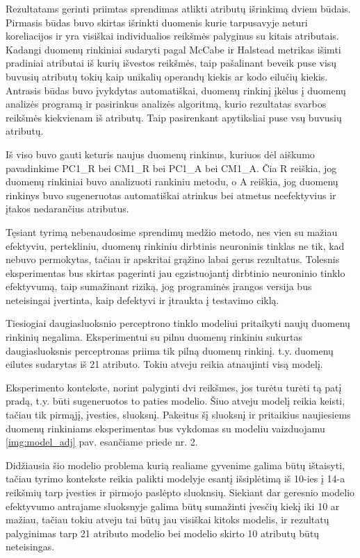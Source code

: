 \documentclass{VUMIFPSbakalaurinis}
\begin{document}
Rezultatams gerinti priimtas sprendimas atlikti atributų išrinkimą dviem būdais. Pirmasis būdas buvo skirtas išrinkti duomenis kurie tarpusavyje neturi koreliacijos ir yra visiškai individualios reikšmės palyginus su kitais atributais. Kadangi duomenų rinkiniai sudaryti pagal McCabe ir Halstead metrikas išimti pradiniai atributai iš kurių išvestos reikšmės, taip pašalinant beveik puse visų buvusių atributų tokių kaip unikalių operandų kiekis ar kodo eilučių kiekis. Antrasis būdas buvo įvykdytas automatiškai, duomenų rinkinį įkėlus į duomenų analizės programą ir pasirinkus analizės algoritmą, kurio rezultatas svarbos reikšmės kiekvienam iš atributų. Taip pasirenkant apytiksliai puse vsų buvusių atributų.

Iš viso buvo gauti keturis naujus duomenų rinkinus, kuriuos dėl aiškumo pavadinkime PC1\_R bei CM1\_R bei PC1\_A bei CM1\_A. Čia R reiškia, jog duomenų rinkiniai buvo analizuoti rankiniu metodu, o A reiškia, jog duomenų rinkinys buvo sugeneruotas automatiškai atrinkus bei atmetus neefektyvius ir įtakos nedarančius atributus.

Tęsiant tyrimą nebenaudosime sprendimų medžio metodo, nes vien su mažiau efektyviu, pertekliniu, duomenų rinkiniu dirbtinis neuroninis tinklas ne tik, kad nebuvo permokytas, tačiau ir apskritai grąžino labai gerus rezultatus. Tolesnis eksperimentas bus skirtas pagerinti jau egzistuojantį dirbtinio neuroninio tinklo efektyvumą, taip sumažinant riziką, jog programinės įrangos versija bus neteisingai įvertinta, kaip defektyvi ir įtraukta į testavimo ciklą.

Tiesiogiai daugiasluoksnio perceptrono tinklo modeliui pritaikyti naujų duomenų rinkinių negalima. Eksperimentui su pilnu duomenų rinkiniu sukurtas daugiasluoksnis perceptronas priima tik pilną duomenų rinkinį. t.y. duomenų eilutes sudarytas iš 21 atributo. Tokiu atveju reikia atnaujinti visą modelį.

Eksperimento kontekste, norint palyginti dvi reikšmes, jos turėtu turėti tą patį pradą, t.y. būti sugeneruotos to paties modelio. Šiuo atveju modelį reikia keisti, tačiau tik pirmąjį, įvesties, sluoksnį. Pakeitus šį sluoksnį ir pritaikius naujiesiems duomenų rinkiniams eksperimentas bus vykdomas su modeliu vaizduojamu \ref{img:model_adj} pav. esančiame priede nr. 2.

Didžiausia šio modelio problema kurią realiame gyvenime galima būtų ištaisyti, tačiau tyrimo kontekste reikia palikti modelyje esantį išsiplėtimą iš 10-ies į 14-a reikšmių tarp įvesties ir pirmojo paslėpto sluoknsių. Siekiant dar geresnio modelio efektyvumo antrajame sluoksnyje galima būtų sumažinti įvesčių kiekį iki 10 ar mažiau, tačiau tokiu atveju tai būtų jau visiškai kitoks modelis, ir rezultatų palyginimas tarp 21 atributo modelio bei modelio skirto 10 atributų būtų neteisingas.
\end{document}
